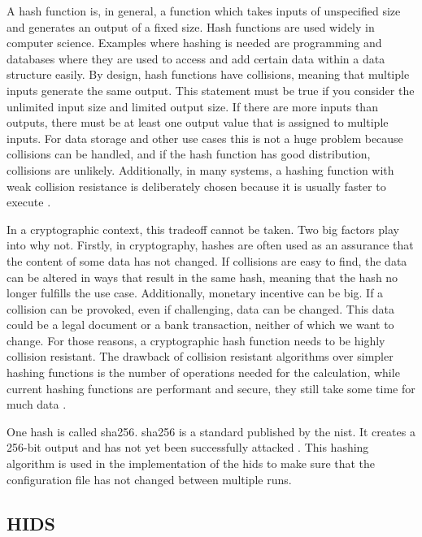 A hash function is, in general, a function which takes inputs of unspecified size and generates an output of a fixed size. Hash functions are used widely in computer science. Examples where hashing is needed are programming and databases where they are used to access and add certain data within a data structure easily. By design, hash functions have \glspl{collision}, meaning that multiple inputs generate the same output. This statement must be true if you consider the unlimited input size and limited output size. If there are more inputs than outputs, there must be at least one output value that is assigned to multiple inputs. For data storage and other use cases this is not a huge problem because \glspl{collision} can be handled, and if the hash function has good distribution, \glspl{collision} are unlikely. Additionally, in many systems, a hashing function with weak \gls{collision} resistance is deliberately chosen because it is usually faster to execute \cite{hash:noncrypto, hash:slow}.

In a cryptographic context, this tradeoff cannot be taken. Two big factors play into why not. Firstly, in cryptography, hashes are often used as an assurance that the content of some data has not changed. If \glspl{collision} are easy to find, the data can be altered in ways that result in the same hash, meaning that the hash no longer fulfills the use case. Additionally, monetary incentive can be big. If a \gls{collision} can be provoked, even if challenging, data can be changed. This data could be a legal document or a bank transaction, neither of which we want to change. For those reasons, a cryptographic hash function needs to be highly \gls{collision} resistant. The drawback of \gls{collision} resistant algorithms over simpler hashing functions is the number of operations needed for the calculation, while current hashing functions are performant and secure, they still take some time for much data \cite{crypto}.

One \gls{hash} is called \gls{sha256}. \gls{sha256} is a standard published by the \gls{nist}. It creates a 256-bit output and has not yet been successfully attacked \cite{sha, crypto}. This hashing algorithm is used in the implementation of the \gls{hids} to make sure that the configuration file has not changed between multiple runs.


\subsection{HIDS}
\label{sec:def:hids}

